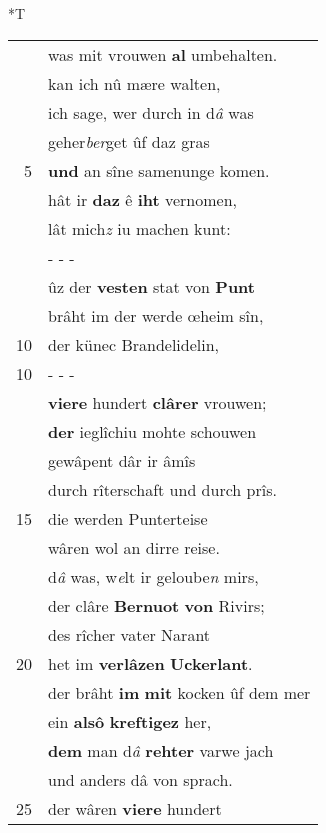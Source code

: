 \documentclass[8pt,a4paper,notitlepage]{article}
\begin{document}
\begin{table}[ht]
\begin{minipage}[t]{0.5\linewidth}
\end{minipage}
\hspace{0.5cm}
\begin{minipage}[t]{0.5\linewidth}
\small
\begin{center}*T
\end{center}
\begin{tabular}{rl}
 & was mit vrouwen \textbf{al} umbehalten.\\ 
 & kan ich nû mære walten,\\ 
 & ich sage, wer durch in d\textit{â} was\\ 
 & geher\textit{ber}get ûf daz gras\\ 
5 & \textbf{und} an sîne samenunge komen.\\ 
 & hât ir \textbf{daz} ê \textbf{iht} vernomen,\\ 
 & lât mich\textit{z} iu machen kunt:\\ 
 & \multicolumn{1}{l}{ - - - }\\ 
 & ûz der \textbf{vesten} stat von \textbf{Punt}\\ 
 & brâht im der werde œheim sîn,\\ 
10 & der künec Brandelidelin,\\ 
10 & \multicolumn{1}{l}{ - - - }\\ 
 & \textbf{viere} hundert \textbf{clârer} vrouwen;\\ 
 & \textbf{der} ieglîchiu mohte schouwen\\ 
 & gewâpent dâr ir âmîs\\ 
 & durch rîterschaft und durch prîs.\\ 
15 & die werden Punterteise\\ 
 & wâren wol an dirre reise.\\ 
 & d\textit{â} was, w\textit{e}lt ir geloube\textit{n} mirs,\\ 
 & der clâre \textbf{Bernuot} \textbf{von} Rivirs;\\ 
 & des rîcher vater Narant\\ 
20 & het im \textbf{verlâzen} \textbf{Uckerlant}.\\ 
 & der brâht \textbf{im} \textbf{mit} kocken ûf dem mer\\ 
 & ein \textbf{alsô} \textbf{kreftigez} her,\\ 
 & \textbf{dem} man d\textit{â} \textbf{rehter} varwe jach\\ 
 & und anders dâ von sprach.\\ 
25 & der wâren \textbf{viere} hundert\\ 

\end{tabular}
\end{minipage}
\end{table}
\end{document}
